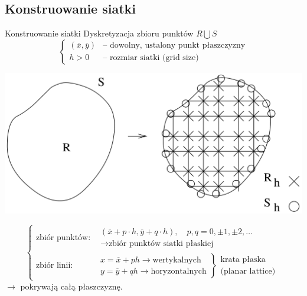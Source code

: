 \subsection{Konstruowanie siatki}

\begin{frame}{Konstruowanie siatki}
  Dyskretyzacja zbioru punktów $R \bigcup S$
  $$ \left\{ \begin{array}{ll}
  (\overline{x}, \overline{y}) & \text{-- dowolny, ustalony punkt płaszczyzny} \\
  h > 0 & \text{-- rozmiar siatki (grid size)}
  \end{array} \right.$$
  \centerline{\includegraphics[width = \textwidth]{img/23/siatka}}
\end{frame}

\begin{frame}
  $$ \left\{ \begin{array}{ll}
  \text{zbiór punktów:} & \begin{array}{l} (\overline{x} + p \cdot h, \overline{y} + q \cdot h), \quad p,q = 0, \pm 1, \pm 2, \dots \\
    \rightarrow \text{zbiór punktów siatki płaskiej} \end{array}\\
  \text{zbiór linii:} & \left. \begin{array}{l}
    x = \overline{x} + p h \rightarrow \text{wertykalnych} \\
    y = \overline{y} + q h \rightarrow \text{horyzontalnych}
  \end{array} \right\} \begin{array}{l} \text{krata płaska} \\ \text{(planar lattice)} \end{array}
  \end{array} \right. $$
  $\rightarrow$ pokrywają całą płaszczyznę.
\end{frame}

